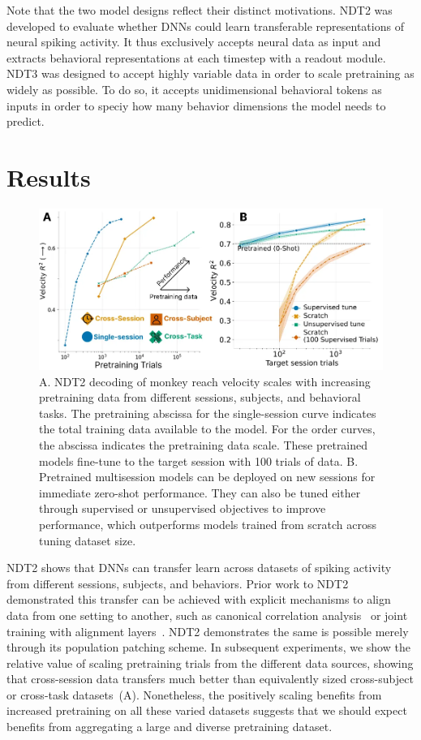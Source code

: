 \documentclass[12pt,oneside]{report}
\begin{document}
Note that the two model designs reflect their distinct motivations. NDT2 was developed to evaluate whether DNNs could learn transferable representations of neural spiking activity. It thus exclusively accepts neural data as input and extracts behavioral representations at each timestep with a readout module. NDT3 was designed to accept highly variable data in order to scale pretraining as widely as possible. To do so, it accepts unidimensional behavioral tokens as inputs in order to speciy how many behavior dimensions the model needs to predict.

\section{Results}


\begin{figure}[h]
  \centering
  \includegraphics[width=0.8\linewidth]{ch2_ndt2_results.png}
  \caption{A. NDT2 decoding of monkey reach velocity scales with increasing pretraining data from different sessions, subjects, and behavioral tasks. The pretraining abscissa for the single-session curve indicates the total training data available to the model. For the order curves, the abscissa indicates the pretraining data scale. These pretrained models fine-tune to the target session with 100 trials of data. B. Pretrained multisession models can be deployed on new sessions for immediate zero-shot performance. They can also be tuned either through supervised or unsupervised objectives to improve performance, which outperforms models trained from scratch across tuning dataset size.}
  \label{fig:ndt2_results}
\end{figure}


NDT2 shows that DNNs can transfer learn across datasets of spiking activity from different sessions, subjects, and behaviors. Prior work to NDT2 demonstrated this transfer can be achieved with explicit mechanisms to align data from one setting to another, such as canonical correlation analysis~\citep{gallego_18_task} or joint training with alignment layers~\citep{pandarinath_18_lfads,turaga_13_stitch}. NDT2 demonstrates the same is possible merely through its population patching scheme. In subsequent experiments, we show the relative value of scaling pretraining trials from the different data sources, showing that cross-session data transfers much better than equivalently sized cross-subject or cross-task datasets~(A). Nonetheless, the positively scaling benefits from increased pretraining on all these varied datasets suggests that we should expect benefits from aggregating a large and diverse pretraining dataset.
\end{document}
